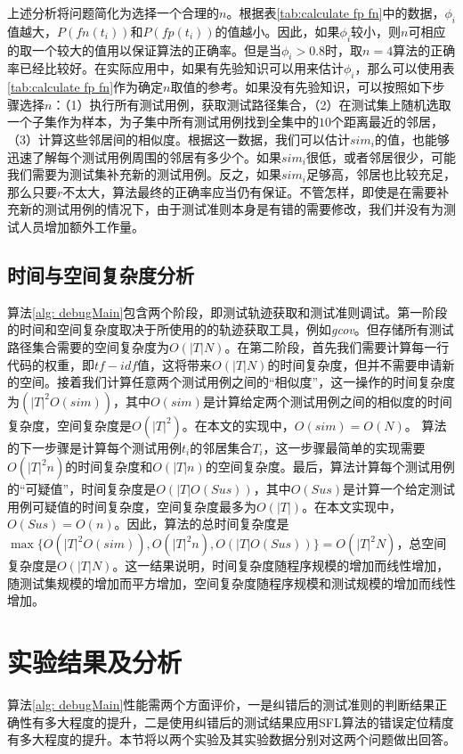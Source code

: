 上述分析将问题简化为选择一个合理的$n$。根据表\ref{tab:calculate fp fn}中的数据，$\phi_i$值越大，$P(fn(t_i))$和$P(fp(t_i))$的值越小。因此，如果$\phi_i$较小，则$n$可相应的取一个较大的值用以保证算法的正确率。但是当$\phi_i > 0.8$时，取$n = 4$算法的正确率已经比较好。在实际应用中，如果有先验知识可以用来估计$\phi_i$，那么可以使用表\ref{tab:calculate fp fn}作为确定$n$取值的参考。如果没有先验知识，可以按照如下步骤选择$n$：（1）执行所有测试用例，获取测试路径集合，（2）在测试集上随机选取一个子集作为样本，为子集中所有测试用例找到全集中的$10$个距离最近的邻居，（3）计算这些邻居间的相似度。根据这一数据，我们可以估计$sim_i$的值，也能够迅速了解每个测试用例周围的邻居有多少个。如果$sim_i$很低，或者邻居很少，可能我们需要为测试集补充新的测试用例。反之，如果$sim_i$足够高，邻居也比较充足，那么只要$r$不太大，算法最终的正确率应当仍有保证。不管怎样，即使是在需要补充新的测试用例的情况下，由于测试准则本身是有错的需要修改，我们并没有为测试人员增加额外工作量。

\subsection{时间与空间复杂度分析}

算法\ref{alg: debugMain}包含两个阶段，即测试轨迹获取和测试准则调试。第一阶段的时间和空间复杂度取决于所使用的的轨迹获取工具，例如\textit{gcov}。但存储所有测试路径集合需要的空间复杂度为$O(|T|N)$。在第二阶段，首先我们需要计算每一行代码的权重，即$tf-idf$值，这将带来$O(|T|N)$的时间复杂度，但并不需要申请新的空间。接着我们计算任意两个测试用例之间的“相似度”，这一操作的时间复杂度为$({|T|}^2 O(sim))$，其中$O(sim)$是计算给定两个测试用例之间的相似度的时间复杂度，空间复杂度是$O({|T|}^2)$。在本文的实现中，$O(sim) = O(N)$。
算法的下一步骤是计算每个测试用例$t_i$的邻居集合$T_i$，这一步骤最简单的实现需要$O({|T|}^2 n)$的时间复杂度和$O(|T| n)$的空间复杂度。最后，算法计算每个测试用例的“可疑值”，时间复杂度是$O(|T| O(Sus))$，其中$O(Sus)$是计算一个给定测试用例可疑值的时间复杂度，空间复杂度最多为$O(|T|)$。在本文实现中，$O(Sus) = O(n)$。因此，算法的总时间复杂度是$\max\{O({|T|}^2 O(sim)), O({|T|}^2 n), O(|T| O(Sus))\} = O({|T|}^2 N)$，总空间复杂度是$O(|T| N)$。这一结果说明，时间复杂度随程序规模的增加而线性增加，随测试集规模的增加而平方增加，空间复杂度随程序规模和测试规模的增加而线性增加。

\section{实验结果及分析}
\label{sec: experiments}
算法\ref{alg: debugMain}性能需两个方面评价，一是纠错后的测试准则的判断结果正确性有多大程度的提升，二是使用纠错后的测试结果应用SFL算法的错误定位精度有多大程度的提升。本节将以两个实验及其实验数据分别对这两个问题做出回答。

